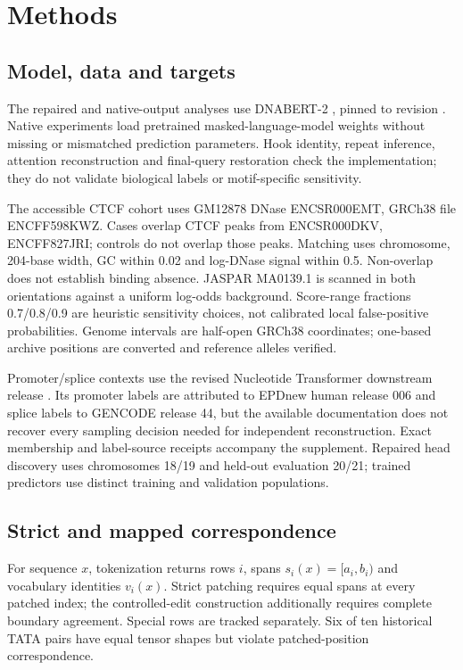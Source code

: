 \documentclass[10pt,letterpaper]{article}
\begin{document}
\section{Methods}
\subsection{Model, data and targets}
The repaired and native-output analyses use DNABERT-2 \citep{zhou2024dnabert2}, pinned to revision . Native experiments load pretrained masked-language-model weights without missing or mismatched prediction parameters. Hook identity, repeat inference, attention reconstruction and final-query restoration check the implementation; they do not validate biological labels or motif-specific sensitivity.

The accessible CTCF cohort uses GM12878 DNase ENCSR000EMT, GRCh38 file ENCFF598KWZ. Cases overlap CTCF peaks from ENCSR000DKV, ENCFF827JRI; controls do not overlap those peaks. Matching uses chromosome, 204-base width, GC within 0.02 and log-DNase signal within 0.5. Non-overlap does not establish binding absence. JASPAR MA0139.1 is scanned in both orientations against a uniform log-odds background. Score-range fractions 0.7/0.8/0.9 are heuristic sensitivity choices, not calibrated local false-positive probabilities. Genome intervals are half-open GRCh38 coordinates; one-based archive positions are converted and reference alleles verified.

Promoter/splice contexts use the revised Nucleotide Transformer downstream release . Its promoter labels are attributed to EPDnew human release 006 and splice labels to GENCODE release 44, but the available documentation does not recover every sampling decision needed for independent reconstruction. Exact membership and label-source receipts accompany the supplement. Repaired head discovery uses chromosomes 18/19 and held-out evaluation 20/21; trained predictors use distinct training and validation populations.
\subsection{Strict and mapped correspondence}
For sequence $x$, tokenization returns rows $i$, spans $s_i(x)=[a_i,b_i)$ and vocabulary identities $v_i(x)$. Strict patching requires equal spans at every patched index; the controlled-edit construction additionally requires complete boundary agreement. Special rows are tracked separately. Six of ten historical TATA pairs have equal tensor shapes but violate patched-position correspondence.
\end{document}
